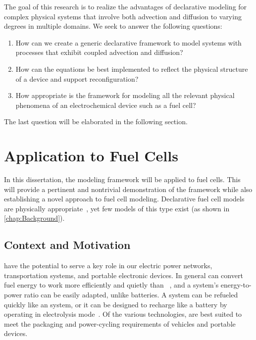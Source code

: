 The goal of this research is to realize the advantages of declarative modeling for complex physical systems that involve both advection and diffusion to varying degrees in multiple domains.  We seek to answer the following questions:
\begin{enumerate}[\bfseries RQ1:]
  \item How can we create a generic declarative framework to model systems with processes that exhibit coupled advection and diffusion?
  \item How can the equations be best implemented to reflect the physical structure of a device and support reconfiguration?
  \item How appropriate is the framework for modeling all the relevant physical phenomena of an electrochemical device such as a fuel cell?
\end{enumerate}
The last question will be elaborated in the following section.



\section{Application to Fuel Cells}

In this dissertation, the modeling framework will be applied to fuel cells.  This will provide a pertinent and nontrivial demonstration of the framework while also establishing a novel approach to fuel cell modeling.  Declarative fuel cell models are physically appropriate~\cite{Zenith2006}, yet few models of this type exist (as shown in \autoref{chap:Background}).


\subsection{Context and Motivation}
\label{sec:FCMotivation}

 have the potential to serve a key role in our electric power networks, transportation systems, and portable electronic devices.  In general  can convert fuel energy to work more efficiently and quietly than ~\cite{Larminie2003}, %
and a  system's energy-to-power ratio can be easily adapted, unlike batteries.  A  system can be refueled quickly like an  system, or it can be designed to recharge like a battery by operating in electrolysis mode~\cite{Burke2003}.  Of the various  technologies,  are best suited to meet the packaging and power-cycling requirements of vehicles and portable devices.

